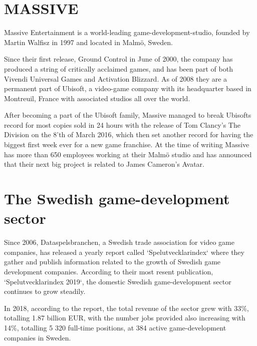 


\section[MASSIVE Entertainment | A Ubisoft studio]{MASSIVE}

{}

  Massive Entertainment is a world-leading game-development-studio, founded by
  Martin Walfisz in 1997 and located in Malmö, Sweden.

  Since their first release, Ground Control in June of 2000,
  the company has produced a string of critically acclaimed games,
  and has been part of both Vivendi Universal Games and Activation Blizzard. As
  of 2008 they are a permanent part of Ubisoft, a video-game company
  with its headquarter based in Montreuil, France with associated studios all
  over the world.

  After becoming a part of the Ubisoft family, Massive managed to break
  Ubisofts record for most copies sold in 24 hours with the release of Tom
  Clancy's The Division on the 8'th of March 2016, which then set another
  record for having the biggest first week ever for a new game franchise.
  At the time of writing Massive has more than 650 employees working at their
  Malmö studio and has announced that their next big project is related to
  James Cameron's Avatar.

\section{The Swedish game-development sector}

  Since 2006, Dataspelsbranchen, a Swedish trade association for video game
  companies\cite{citeDataspelsbranchen}, has released a yearly report called
  `Spelutvecklarindex` where they gather and publish information related to the
  growth of Swedish game development companies.
  According to their most resent publication,
  `Spelutvecklarindex 2019`\cite{citeIndex2019}, the domestic Swedish
  game-development sector continues to grow steadily.

  In 2018, according to the report, the total revenue of the sector grew with
  33\%, totalling 1.87 billion EUR, with the number jobs provided also increasing
  with 14\%, totalling 5 320\cite[p. 12]{citeIndex2019} full-time positions,
  at 384\cite[p. 38]{citeIndex2019} active game-development companies in Sweden.

